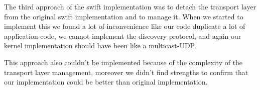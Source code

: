 The third approach of the swift implementation was to detach the transport layer from the original swift implementation
and to manage it. When we started to implement this we found a lot of inconvenience like our code duplicate a lot of
application code, we cannot implement the discovery protocol, and again our kernel implementation should have been like
a multicast-UDP.

This approach also couldn't be implemented because of the complexity of the transport layer management, moreover we
didn't find strengths to confirm that our implementation could be better than original implementation.